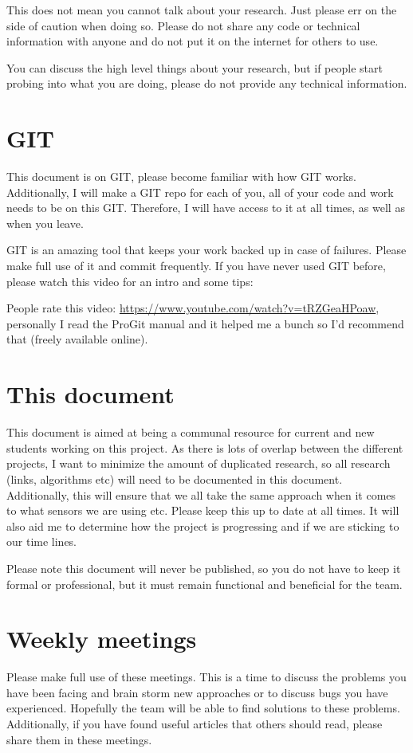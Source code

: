 	This does not mean you cannot talk about your research. Just please err on the side of caution when doing so. Please do not share any code or technical information with anyone and do not put it on the internet for others to use. 
	
	You can discuss the high level things about your research, but if people start probing into what you are doing, please do not provide any technical information. 

\section{GIT}
	This document is on GIT, please become familiar with how GIT works. Additionally, I will make a GIT repo for each of you, all of your code and work needs to be on this GIT. Therefore, I will have access to it at all times, as well as when you leave. 
	
	GIT is an amazing tool that keeps your work backed up in case of failures. Please make full use of it and commit frequently. If you have never used GIT before, please watch this video for an intro and some tips:
	
	People rate this video: \url{https://www.youtube.com/watch?v=tRZGeaHPoaw}, personally I read the ProGit manual and it helped me a bunch so I'd recommend that (freely available online).

\section{This document}
	This document is aimed at being a communal resource for current and new students working on this project. As there is lots of overlap between the different projects, I want to minimize the amount of duplicated research, so all research (links, algorithms etc) will need to be documented in this document. Additionally, this will ensure that we all take the same approach when it comes to what sensors we are using etc. Please keep this up to date at all times. It will also aid me to determine how the project is progressing and if we are sticking to our time lines. 
	
	Please note this document will never be published, so you do not have to keep it formal or professional, but it must remain functional and beneficial for the team. 

\section{Weekly meetings}
	Please make full use of these meetings. This is a time to discuss the problems you have been facing and brain storm new approaches or to discuss bugs you have experienced. Hopefully the team will be able to find solutions to these problems. Additionally, if you have found useful articles that others should read, please share them in these meetings. 

